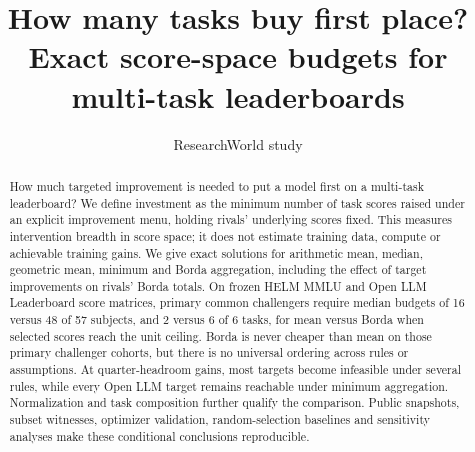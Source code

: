 \documentclass{article}
\title{How many tasks buy first place?\\Exact score-space budgets for multi-task leaderboards}
\author{ResearchWorld study}
\begin{document}
\maketitle
\begin{abstract}
How much targeted improvement is needed to put a model first on a multi-task leaderboard? We define investment as the minimum number of task scores raised under an explicit improvement menu, holding rivals' underlying scores fixed. This measures intervention breadth in score space; it does not estimate training data, compute or achievable training gains. We give exact solutions for arithmetic mean, median, geometric mean, minimum and Borda aggregation, including the effect of target improvements on rivals' Borda totals. On frozen HELM MMLU and Open LLM Leaderboard score matrices, primary common challengers require median budgets of 16 versus 48 of 57 subjects, and 2 versus 6 of 6 tasks, for mean versus Borda when selected scores reach the unit ceiling. Borda is never cheaper than mean on those primary challenger cohorts, but there is no universal ordering across rules or assumptions. At quarter-headroom gains, most targets become infeasible under several rules, while every Open LLM target remains reachable under minimum aggregation. Normalization and task composition further qualify the comparison. Public snapshots, subset witnesses, optimizer validation, random-selection baselines and sensitivity analyses make these conditional conclusions reproducible.
\end{abstract}





\clearpage


\appendix




\clearpage

\end{document}
